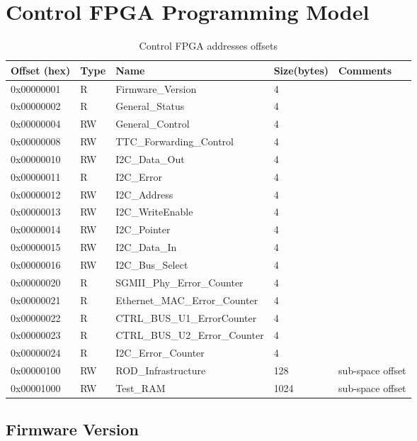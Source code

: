 

\section{Control FPGA Programming Model}
\label{section_1}

%
\begin {table}[H]
\begin{center}
\caption {Control FPGA addresses offsets}
\label{tab_top_reg}
\begin{tabular}{|l|l|l|l|l|}
\hline
Offset (hex)& Type & Name & Size(bytes) & Comments \\
\hline
0x00000001 & R&Firmware\_Version& 4 & \\
\hline
0x00000002 & R &General\_Status& 4 & \\
\hline
0x00000004 & RW &General\_Control& 4 & \\
\hline
0x00000008 & RW&TTC\_Forwarding\_Control& 4 & \\
\hline
0x00000010 & RW&I2C\_Data\_Out& 4 & \\
\hline
0x00000011 & R&I2C\_Error& 4 & \\
\hline
0x00000012 & RW&I2C\_Address& 4 & \\
\hline
0x00000013 & RW&I2C\_WriteEnable& 4 & \\
\hline
0x00000014 & RW&I2C\_Pointer& 4 & \\
\hline
0x00000015 & RW&I2C\_Data\_In& 4 & \\
\hline
0x00000016 & RW&I2C\_Bus\_Select& 4 & \\
\hline
0x00000020 & R&SGMII\_Phy\_Error\_Counter& 4&  \\
\hline
0x00000021 & R&Ethernet\_MAC\_Error\_Counter& 4 & \\
\hline
0x00000022 & R&CTRL\_BUS\_U1\_ErrorCounter& 4 & \\
\hline
0x00000023 & R&CTRL\_BUS\_U2\_Error\_Counter& 4 & \\
\hline
0x00000024 & R&I2C\_Error\_Counter& 4 & \\
\hline
0x00000100 & RW&ROD\_Infrastructure& 128 & sub-space offset \\
\hline
0x00001000 & RW&Test\_RAM& 1024 & sub-space offset \\
\hline
\end{tabular}
\end{center}
\end{table}
%



\subsection{Firmware Version}

